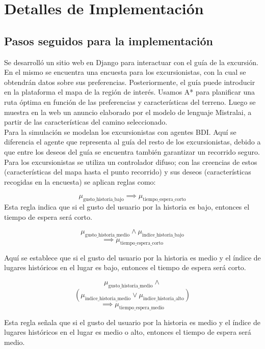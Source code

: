 \documentclass[10pt,twocolumn]{article}
\begin{document}
	\section{Detalles de Implementación}
	
	\subsection{Pasos seguidos para la implementación}
	Se desarrolló un sitio web en Django para interactuar con el guía de la excursión. En el mismo se encuentra una encuesta para los excursionistas, con la cual se obtendrán datos sobre sus preferencias. Posteriormente, el guía puede introducir en la plataforma el mapa de la región de interés. Usamos A* para planificar una ruta óptima en función de las preferencias y características del terreno. Luego se muestra en la web un anuncio elaborado por el modelo de lenguaje Mistralai, a partir de las características del camino seleccionado.\\
	Para la simulación se modelan los excursionistas con agentes BDI. Aquí se diferencia el agente que representa al guía del resto de los excursionistas, debido a que entre los deseos del guía se encuentra también garantizar un recorrido seguro. Para los excursionistas se utiliza un controlador difuso; con las creencias de estos (características del mapa hasta el punto recorrido) y sus deseos (características recogidas en la encuesta) se aplican reglas como:
	
	$$
	 \mu_{\text{gusto\_historia\_bajo}} \implies \mu_{\text{tiempo\_espera\_corto}}
	$$
	Esta regla indica que si el gusto del usuario por la historia es bajo, entonces el tiempo de espera será corto.
	
	$$
	\mu_{\text{gusto\_historia\_medio}} \land \mu_{\text{indice\_historia\_bajo}}$$
	$$\implies \mu_{\text{tiempo\_espera\_corto}}$$
	
	
	Aquí se establece que si el gusto del usuario por la historia es medio y el índice de lugares históricos en el lugar es bajo, entonces el tiempo de espera será corto.
	
	$$
		\mu_{\text{gusto\_historia\_medio}}  \land $$
		 $$ \left( \mu_{\text{indice\_historia\_medio}}	
		 \lor \mu_{\text{indice\_historia\_alto}} \right)$$
		$$\implies \mu_{\text{tiempo\_espera\_medio}}$$

	Esta regla señala que si el gusto del usuario por la historia es medio y el índice de lugares históricos en el lugar es medio o alto, entonces el tiempo de espera será medio.
	
\end{document}

